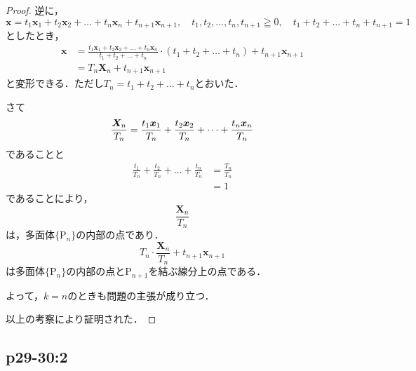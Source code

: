 \documentclass[uplatex,dvipdfmx,a4paper,10pt,fleqn]{jsarticle}
\begin{document}
\begin{leftbar}
\begin{proof}
    逆に，
    \[
        \bm{x} = t_1 \bm{x}_1 + t_2 \bm{x}_2 + \dots + t_n \bm{x}_n + t_{n+1} \bm{x}_{n+1} , \quad t_1, t_2 ,\dots , t_n,t_{n+1} \geqq 0 ,\quad  t_1 +t_2 + \dots+t_n + t_{n+1} =1
    \]
    としたとき，
    \begin{align*}
        \bm{x} &=\frac{t_1 \bm{x}_1 + t_2 \bm{x}_2+\dots+ t_n \bm{x}_n}{t_1+t_2+\dots+t_n} \cdot (t_1+t_2+\dots+t_n) +t_{n+1} \bm{x}_{n+1} \\
        & = T_n \bm{X}_n + t_{n+1} \bm{x}_{n+1}
    \end{align*}
    と変形できる．ただし$T_n = t_1 + t_2 +\dots+t_n$とおいた．
    
    さて
    \[
        \frac{\bm{X}_n }{T_n} = \frac{t_1 \bm{x}_1 }{T_n}+ \frac{t_2 \bm{x}_2 }{T_n}+\dots +  \frac{t_n \bm{x}_n }{T_n}  \\
    \]
    であることと
    \begin{align*}
        \frac{t_1}{T_n}+\frac{t_2 }{T_n} +\dots +\frac{t_n }{T_n}& = \frac{T_n}{T_n} \\
        & = 1
    \end{align*}
    であることにより，
    \[
        \frac{\bm{X}_n}{T_n}
    \]
    は，多面体$\{ \mathrm{P}_n \}$の内部の点であり．
    \[
        T_n \cdot \frac{\bm{X}_n}{T_n} + t_{n+1} \bm{x}_{n+1}
    \]
    は多面体$\{ \mathrm{P}_n \}$の内部の点と$\mathrm{P}_{n+1}$を結ぶ線分上の点である．

    よって，$k=n$のときも問題の主張が成り立つ．

    以上の考察により証明された．
\end{proof}
\end{leftbar}

\subsection*{p29-30:2}
\end{document}
